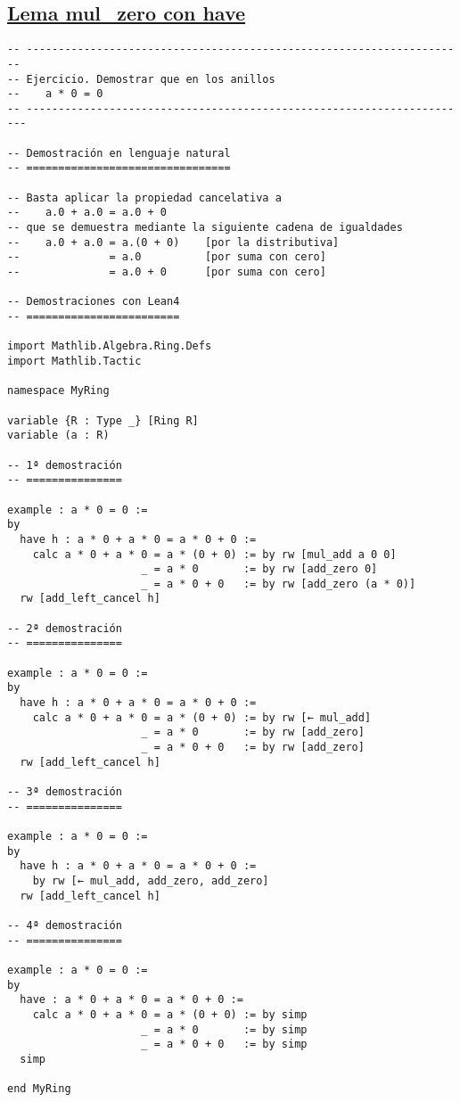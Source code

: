 \subsection{\href{./src/Basicos/mul\_zero.lean}{Lema mul\_zero con have}}
\label{sec:orgcf9870f}
\begin{verbatim}
-- ---------------------------------------------------------------------
-- Ejercicio. Demostrar que en los anillos
--    a * 0 = 0
-- ----------------------------------------------------------------------

-- Demostración en lenguaje natural
-- ================================

-- Basta aplicar la propiedad cancelativa a
--    a.0 + a.0 = a.0 + 0
-- que se demuestra mediante la siguiente cadena de igualdades
--    a.0 + a.0 = a.(0 + 0)    [por la distributiva]
--              = a.0          [por suma con cero]
--              = a.0 + 0      [por suma con cero]

-- Demostraciones con Lean4
-- ========================

import Mathlib.Algebra.Ring.Defs
import Mathlib.Tactic

namespace MyRing

variable {R : Type _} [Ring R]
variable (a : R)

-- 1ª demostración
-- ===============

example : a * 0 = 0 :=
by
  have h : a * 0 + a * 0 = a * 0 + 0 :=
    calc a * 0 + a * 0 = a * (0 + 0) := by rw [mul_add a 0 0]
                     _ = a * 0       := by rw [add_zero 0]
                     _ = a * 0 + 0   := by rw [add_zero (a * 0)]
  rw [add_left_cancel h]

-- 2ª demostración
-- ===============

example : a * 0 = 0 :=
by
  have h : a * 0 + a * 0 = a * 0 + 0 :=
    calc a * 0 + a * 0 = a * (0 + 0) := by rw [← mul_add]
                     _ = a * 0       := by rw [add_zero]
                     _ = a * 0 + 0   := by rw [add_zero]
  rw [add_left_cancel h]

-- 3ª demostración
-- ===============

example : a * 0 = 0 :=
by
  have h : a * 0 + a * 0 = a * 0 + 0 :=
    by rw [← mul_add, add_zero, add_zero]
  rw [add_left_cancel h]

-- 4ª demostración
-- ===============

example : a * 0 = 0 :=
by
  have : a * 0 + a * 0 = a * 0 + 0 :=
    calc a * 0 + a * 0 = a * (0 + 0) := by simp
                     _ = a * 0       := by simp
                     _ = a * 0 + 0   := by simp
  simp

end MyRing
\end{verbatim}


